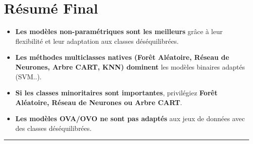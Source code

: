\documentclass[
]{article}
\providecommand{\tightlist}{%
  \setlength{\itemsep}{0pt}\setlength{\parskip}{0pt}}\usepackage{longtable,booktabs,array}
\begin{document}
\section{Résumé Final}\label{ruxe9sumuxe9-final}

\begin{itemize}
\tightlist
\item
  \textbf{Les modèles non-paramétriques sont les meilleurs} grâce à leur
  flexibilité et leur adaptation aux classes déséquilibrées.
\item
  \textbf{Les méthodes multiclasses natives (Forêt Aléatoire, Réseau de
  Neurones, Arbre CART, KNN) dominent} les modèles binaires adaptés
  (SVM..).
\item
  \textbf{Si les classes minoritaires sont importantes}, privilégiez
  \textbf{Forêt Aléatoire, Réseau de Neurones ou Arbre CART}.
\item
  \textbf{Les modèles OVA/OVO ne sont pas adaptés} aux jeux de données
  avec des classes déséquilibrées.
\end{itemize}

\begin{center}\rule{0.5\linewidth}{0.5pt}\end{center}
\end{document}
